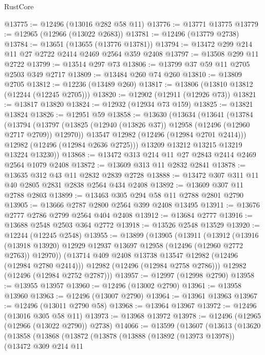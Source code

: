 \begin{lexlean}{RustCore}
\begin{coremodule}
@13775 := @12496 (@13016 @282 @58 @11)
@13776 := @13771 @13775
@13779 := @12965 (@12966 (@13022 @2683))
@13781 := @12496 (@13779 @2738)
@13784 := @13651 (@13655 (@13776 @13781))
@13794 := @13472 @299 @214 @11 @27 @2722 @2414 @2469 @2564 @359 @2408
@13797 := @13508 @299 @11 @2722
@13799 := @13514 @297 @73
@13806 := @13799 @37 @59 @11 @2705 @2503 @349 @2717
@13809 := @13484 @260 @74 @260
@13810 := @13809 @2705
@13812 := @12236 (@13489 @260)
@13817 := @13806 (@13810 @13812 (@12244 (@12245 @2705)))
@13820 := @12902 (@12911 (@12926 @73))
@13821 := @13817 @13820
@13824 := @12932 (@12934 @73 @159)
@13825 := @13821 @13824
@13826 := @12951 @59
@13858 := @13630
    (@13634
      (@13641
        (@13784
          (@13794
            (@13797 (@13825 (@12940 (@13826 @37)) @12958 (@12496 (@12960 @2717 @2709)) @12970))
            @13547
            @12982
            (@12496 (@12984 @2701 @2414)))
          @12982
          (@12496 (@12984 @2636 @2725)))
        @13209
        @13212
        @13215
        @13219
        @13224
        @13230))
@13868 := @13472 @313 @214 @11 @27 @2843 @2414 @2469 @2564 @1079 @2408
@13872 := @13609 @313 @11 @2832 @2841
@13878 := @13635 @312 @43 @11 @2832 @2839 @2728
@13888 := @13472 @307 @311 @11 @40 @2805 @2831 @2838 @2564 @434 @2408
@13892 := @13609 @307 @11 @2788 @2803
@13899 := @13463 @305 @294 @58 @11 @2788 @2801 @2790
@13905 := @13666 @2787 @2800 @2564 @399 @2408 @13495
@13911 := @13676 @2777 @2786 @2799 @2564 @404 @2408
@13912 := @13684 @2777
@13916 := @13688 @2548 @2503 @364 @2772
@13918 := @13526 @2548 @13529
@13920 := @12244 (@12245 @2548)
@13955 := @13899
    (@13905
      (@13911
        (@13912
          (@13916 (@13918 @13920) @12929 @12937 @13697 @12958 (@12496 (@12960 @2772 @2763)) @12970))
        (@13714 @409 @2408 @13738 @13547 @12982 (@12496 (@12984 @2780 @2414)))
        @12982
        (@12496 (@12984 @2758 @2786)))
      @12982
      (@12496 (@12984 @2752 @2787)))
@13957 := @12997 (@12998 @2790)
@13958 := @13955 @13957
@13960 := @12496 (@13002 @2790)
@13961 := @13958 @13960
@13963 := @12496 (@13007 @2790)
@13964 := @13961 @13963
@13967 := @12496 (@13011 @2790 @58)
@13968 := @13964 @13967
@13972 := @12496 (@13016 @305 @58 @11)
@13973 := @13968 @13972
@13978 := @12496 (@12965 (@12966 (@13022 @2790)) @2738)
@14066 := @13599
    (@13607
      (@13613
        (@13620
          (@13858
            (@13868
              (@13872
                (@13878
                  (@13888
                    (@13892 (@13973 @13978))
                    (@13472
                      @309
                      @214
                      @11

\end{coremodule}
\end{lexlean}
